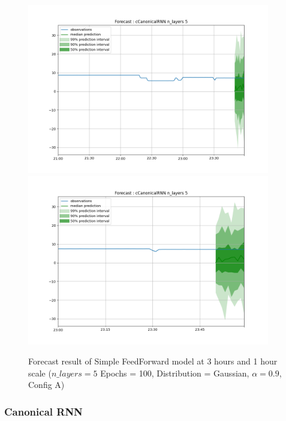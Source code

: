 \documentclass[a4paper, 12pt]{article}
\begin{document}
\begin{figure}[!h]
    \centering
    \includegraphics[width=400px]{plots/forecast/a/cCanonicalRNN/n_layers/5/180.png}
    \includegraphics[width=400px]{plots/forecast/a/cCanonicalRNN/n_layers/5/60.png}
    \caption{Forecast result of Simple FeedForward model at 3 hours and 1 hour scale ($n\_layers = 5$ Epochs = 100, Distribution = Gaussian, $\alpha = 0.9$, Config A)}
    \label{fig:canonicalrnn}
\end{figure}

\subsubsection{Canonical RNN} \label{comp_canonicalrnn}
\end{document}
